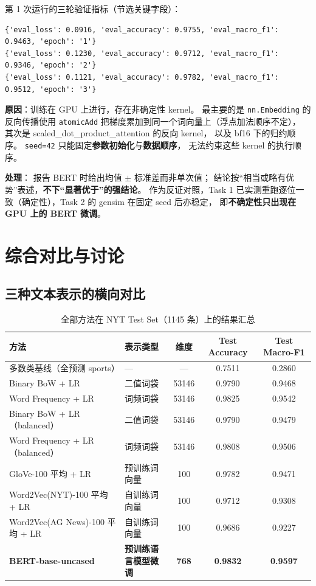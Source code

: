 \documentclass[12pt,a4paper]{ctexart}
\newcommand{\fpath}[1]{\texttt{#1}}
\newcommand{\best}[1]{\textbf{#1}}
\begin{document}
第 1 次运行的三轮验证指标（节选关键字段）：

{\footnotesize
\begin{verbatim}
{'eval_loss': 0.0916, 'eval_accuracy': 0.9755, 'eval_macro_f1': 0.9463, 'epoch': '1'}
{'eval_loss': 0.1230, 'eval_accuracy': 0.9712, 'eval_macro_f1': 0.9346, 'epoch': '2'}
{'eval_loss': 0.1121, 'eval_accuracy': 0.9782, 'eval_macro_f1': 0.9512, 'epoch': '3'}
\end{verbatim}
}

\textbf{原因}：训练在 GPU 上进行，存在非确定性 kernel。
最主要的是 \fpath{nn.Embedding} 的反向传播使用 \fpath{atomicAdd}
把梯度累加到同一个词向量上（浮点加法顺序不定），
其次是 scaled\_dot\_product\_attention 的反向 kernel，
以及 bf16 下的归约顺序。
\fpath{seed=42} 只能固定\textbf{参数初始化}与\textbf{数据顺序}，
无法约束这些 kernel 的执行顺序。

\textbf{处理}：
报告 BERT 时给出均值 $\pm$ 标准差而非单次值；
结论按``相当或略有优势''表述，\textbf{不下``显著优于''的强结论}。
作为反证对照，Task 1 已实测重跑逐位一致（确定性），Task 2 的 gensim 在固定 seed 后亦稳定，
即\textbf{不确定性只出现在 GPU 上的 BERT 微调}。

\section{综合对比与讨论}

\subsection{三种文本表示的横向对比}

\begin{table}[htbp]
\centering
\footnotesize
\caption{全部方法在 NYT Test Set（1145 条）上的结果汇总}
\label{tab:main}
\begin{tabular}{llccc}
\toprule
方法 & 表示类型 & 维度 & Test Accuracy & Test Macro-F1 \\
\midrule
多数类基线（全预测 sports） & — & — & 0.7511 & 0.2860 \\
\midrule
Binary BoW + LR & 二值词袋 & 53146 & 0.9790 & 0.9468 \\
Word Frequency + LR & 词频词袋 & 53146 & 0.9825 & 0.9542 \\
Binary BoW + LR（balanced） & 二值词袋 & 53146 & 0.9790 & 0.9479 \\
Word Frequency + LR（balanced） & 词频词袋 & 53146 & 0.9808 & 0.9506 \\
\midrule
GloVe-100 平均 + LR & 预训练词向量 & 100 & 0.9782 & 0.9471 \\
Word2Vec(NYT)-100 平均 + LR & 自训练词向量 & 100 & 0.9712 & 0.9308 \\
Word2Vec(AG News)-100 平均 + LR & 自训练词向量 & 100 & 0.9686 & 0.9227 \\
\midrule
\best{BERT-base-uncased} & \best{预训练语言模型微调} & \best{768} & \best{0.9832} & \best{0.9597} \\
\bottomrule
\end{tabular}
\end{table}
\end{document}
